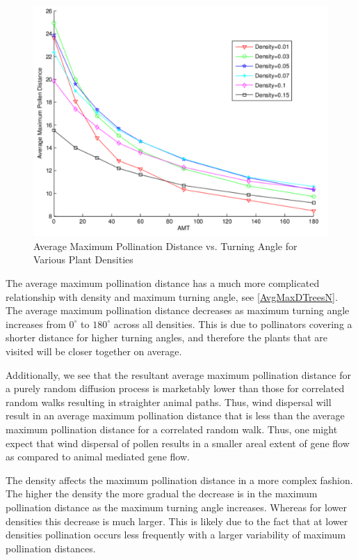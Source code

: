 \begin{figure}
  \begin{center}
  \includegraphics[scale=0.5]{MaxPollenVsAMT.pdf}
  \end{center}
  \caption{\small Average Maximum Pollination Distance vs. Turning Angle for Various Plant Densities}
  \label{AvgMaxDTreesN}
\end{figure}

The average maximum pollination distance has a much more complicated
relationship with density and maximum turning angle, see
\autoref{AvgMaxDTreesN}.  The average maximum pollination distance decreases as
maximum turning angle increases from $0^{\circ}$ to $180^{\circ}$ across all
densities.  This is due to pollinators covering a shorter distance for higher
turning angles, and therefore the plants that are visited will be closer
together on average. 

Additionally, we see that the resultant average maximum pollination distance for
a purely random diffusion process is marketably lower than those for correlated
random walks resulting in straighter animal paths. Thus, wind dispersal will
result in an average maximum pollination distance that is less than the average
maximum pollination distance for a correlated random walk. Thus, one might
expect that wind dispersal of pollen results in a smaller areal extent of gene
flow as compared to animal mediated gene flow.

The density affects the maximum pollination distance in a more complex fashion.
The higher the density the more gradual the decrease is in the maximum
pollination distance as the maximum turning angle increases.  Whereas for lower
densities this decrease is much larger.  This is likely due to the fact that at
lower densities pollination occurs less frequently with a larger variability of
maximum pollination distances.

